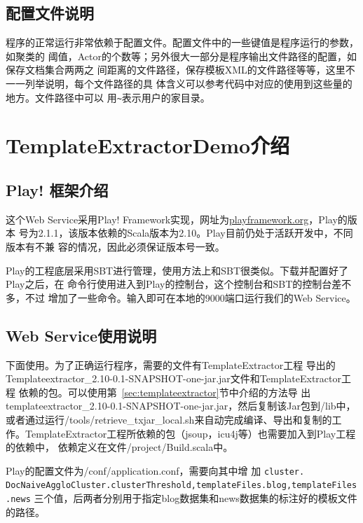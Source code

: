 \documentclass{article}
\begin{document}
\subsection{配置文件说明}
程序的正常运行非常依赖于配置文件。配置文件中的一些键值是程序运行的参数，如聚类的
阈值，Actor的个数等；另外很大一部分是程序输出文件路径的配置，如保存文档集合两两之
间距离的文件路径，保存模板XML的文件路径等等，这里不一一列举说明，每个文件路径的具
体含义可以参考代码中对应的使用到这些量的地方。文件路径中可以
用\texttt{\textasciitilde{}}表示用户的家目录。

\section{TemplateExtractorDemo介绍}
\label{sec:templ}

\subsection{Play! 框架介绍}
\label{sec:play}
这个Web Service采用Play! Framework实现，网址为\url{playframework.org}，Play的版本
号为2.1.1，该版本依赖的Scala版本为2.10。Play目前仍处于活跃开发中，不同版本有不兼
容的情况，因此必须保证版本号一致。

Play的工程底层采用SBT进行管理，使用方法上和SBT很类似。下载并配置好了Play之后，在
命令行使用进入到Play的控制台，这个控制台和SBT的控制台差不多，不过
增加了一些命令。输入即可在本地的9000端口运行我们的Web Service。

\subsection{Web Service使用说明}
下面使用。为了正确运行程序，需要的文件有TemplateExtractor工程
导出的Templateextractor\_2.10-0.1-SNAPSHOT-one-jar.jar文件和TemplateExtractor工程
依赖的包。可以使用第~\ref{sec:templateextractor}节中介绍的方法导
出templateextractor\_2.10-0.1-SNAPSHOT-one-jar.jar，然后复制该Jar包到\prj/lib中，
或者通过运行\prj/tools/retrieve\_txjar\_local.sh来自动完成编译、导出和复制的工
作。TemplateExtractor工程所依赖的包（jsoup，icu4j等）也需要加入到Play工程的依赖中，
依赖定义在文件\prj/project/Build.scala中。

Play的配置文件为\prj/conf/application.conf，需要向其中增
加
\texttt{cluster.\\DocNaiveAggloCluster.clusterThreshold,templateFiles.blog,templateFiles.news}
三个值，后两者分别用于指定blog数据集和news数据集的标注好的模板文件的路径。
\end{document}
